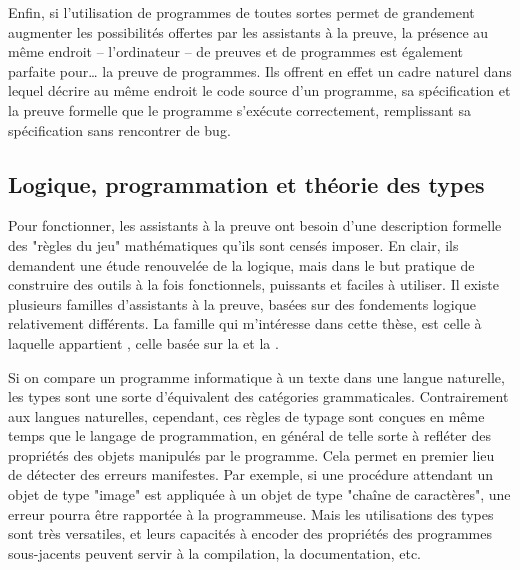 Enfin, si l’utilisation de programmes de toutes sortes permet de grandement augmenter
les possibilités offertes par les assistants à la preuve,
la présence au même endroit – l’ordinateur –
de preuves et de programmes est également parfaite pour… la preuve de programmes.
Ils offrent en effet un cadre naturel dans lequel décrire au même endroit
le code source d’un programme, sa spécification et la preuve formelle que le
programme s’exécute correctement,
remplissant sa spécification sans rencontrer de bug.

\subsection{Logique, programmation et théorie des types}

Pour fonctionner, les assistants à la preuve ont besoin d’une
description formelle des "règles du jeu" mathématiques qu’ils sont censés imposer.
En clair, ils demandent une étude renouvelée de la logique, mais dans le but
pratique de construire des outils à la fois fonctionnels,
puissants et faciles à utiliser.
Il existe plusieurs familles d’assistants à la preuve, basées sur des fondements
logique relativement différents. La famille qui m’intéresse dans cette thèse, est
celle à laquelle appartient , celle basée sur la
 et la .

Si on compare un programme informatique à un texte dans une langue naturelle,
les types sont une sorte d’équivalent des catégories grammaticales.
Contrairement aux langues naturelles, cependant, ces règles de typage sont conçues
en même temps que le langage de programmation, en général
de telle sorte à refléter des propriétés
des objets manipulés par le programme. Cela permet en premier lieu de
détecter des erreurs manifestes.
Par exemple, si une procédure attendant un objet de type "image" est
appliquée à un objet de type "chaîne de caractères", une erreur pourra être rapportée
à la programmeuse.
Mais les utilisations des types sont très versatiles, et leurs capacités à encoder
des propriétés des programmes sous-jacents peuvent servir à la compilation, la
documentation, etc.

